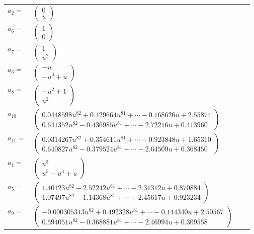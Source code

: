 \documentclass[1p]{elsarticle_modified}
\theoremstyle{definition}
\begin{document}
\begin{tabular}{m{7pt} m{180pt} m{7pt} m{180pt} }
\flushright $a_{2}=$&$\begin{pmatrix}0\\u\end{pmatrix}$ \\
\flushright $a_{6}=$&$\begin{pmatrix}1\\0\end{pmatrix}$ \\
\flushright $a_{7}=$&$\begin{pmatrix}1\\u^2\end{pmatrix}$ \\
\flushright $a_{3}=$&$\begin{pmatrix}- u\\- u^3+u\end{pmatrix}$ \\
\flushright $a_{8}=$&$\begin{pmatrix}- u^2+1\\u^2\end{pmatrix}$ \\
\flushright $a_{10}=$&$\begin{pmatrix}0.0448598 u^{82}+0.429664 u^{81}+\cdots-0.168626 u+2.55874\\0.641352 u^{82}-0.436985 u^{81}+\cdots-2.72216 u+0.413960\end{pmatrix}$ \\
\flushright $a_{11}=$&$\begin{pmatrix}0.0314267 u^{82}+0.354611 u^{81}+\cdots-0.923848 u+1.65310\\0.640827 u^{82}-0.379524 u^{81}+\cdots-2.64509 u+0.368450\end{pmatrix}$ \\
\flushright $a_{1}=$&$\begin{pmatrix}u^3\\u^5- u^3+u\end{pmatrix}$ \\
\flushright $a_{5}=$&$\begin{pmatrix}1.40123 u^{82}-2.52242 u^{81}+\cdots-2.31312 u+0.870884\\1.07497 u^{82}-1.14368 u^{81}+\cdots+2.45617 u+0.923234\end{pmatrix}$ \\
\flushright $a_{9}=$&$\begin{pmatrix}-0.000305313 u^{82}+0.492328 u^{81}+\cdots-0.144340 u+2.50567\\0.594051 u^{82}-0.368881 u^{81}+\cdots-2.46994 u+0.309558\end{pmatrix}$ \\

\end{tabular}
\end{document}
